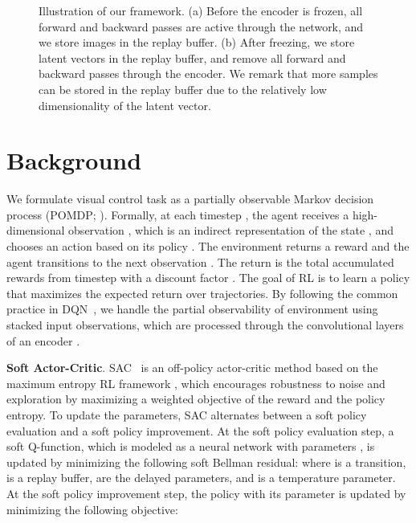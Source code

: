 \documentclass{article}
\begin{document}
\begin{figure*} [t] \centering
{} 
\caption{Illustration of our framework.
(a) Before the encoder is frozen,
all forward and backward passes are active through the network, and we store images in the replay buffer.
(b) After freezing,
we store latent vectors in the replay buffer, 
and remove all forward and backward passes through the encoder. We remark that more samples can be stored in the replay buffer due to the relatively low dimensionality of the latent vector.} \label{fig:main_figure}
\end{figure*}

\section{Background} \label{sec:background}



We formulate visual control task as a partially observable Markov decision process (POMDP; \citealt{sutton2018reinforcement, kaelbling1998planning}).
Formally, at each timestep , the agent receives a high-dimensional observation , which is an indirect representation of the state , and chooses an action  based on its policy .
The environment returns a reward  and the agent transitions to the next observation .
The return  is the total accumulated rewards from timestep  with a discount factor .
The goal of RL is to learn a policy  that maximizes the expected return over trajectories.
By following the common practice in DQN~\citep{mnih2015human}, we handle the partial observability of environment using stacked input observations, which are processed through the convolutional layers of an encoder .


{\bf Soft Actor-Critic}. SAC~\citep{haarnoja2018soft} is an off-policy actor-critic method based on the maximum entropy RL framework \citep{ziebart2010modeling}, which encourages robustness to noise and exploration by maximizing a weighted objective of the reward and the policy entropy.
To update the parameters, SAC alternates between a soft policy evaluation and a soft policy improvement.
At the soft policy evaluation step,
a soft Q-function, which is modeled as a neural network with parameters , is updated by minimizing the following soft Bellman residual:
 \label{eq:sac_critic_tot} 
where  is a transition,
 is a replay buffer,
 are the delayed parameters,
and  is a temperature parameter.
At the soft policy improvement step,
the policy  with its parameter  is updated by minimizing the following objective:
\end{document}
